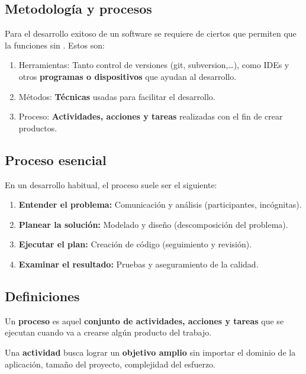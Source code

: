 \subsection{Metodología y procesos}\label{subsec:metodologia-y-procesos}
Para el desarrollo exitoso de un software se requiere de ciertos  que permiten que la  funciones sin .
Estos  son:
\begin{enumerate}
    \item Herramientas: Tanto control de versiones (git, subversion,\dots), como IDEs y otros \textbf{programas o dispositivos} que ayudan al desarrollo.
    \item Métodos: \textbf{Técnicas} usadas para facilitar el desarrollo.
    \item Proceso: \textbf{Actividades, acciones y tareas} realizadas con el fin de crear productos.
\end{enumerate}

\subsection{Proceso esencial}\label{subsec:proceso-esencial}
En un desarrollo habitual, el proceso suele ser el siguiente:

\begin{enumerate}
    \item \textbf{Entender el problema:} Comunicación y análisis (participantes, incógnitas).
    \item \textbf{Planear la solución:} Modelado y diseño (descomposición del problema).
    \item \textbf{Ejecutar el plan:} Creación de código (seguimiento y revisión).
    \item \textbf{Examinar el resultado:} Pruebas y aseguramiento de la calidad.
\end{enumerate}

\subsection{Definiciones}\label{subsec:definiciones}
\begin{definicion}
    Un \textbf{proceso} es aquel \textbf{conjunto de actividades, acciones y tareas} que se ejecutan cuando va a crearse algún producto del trabajo.
\end{definicion}
\begin{definicion}
    Una \textbf{actividad} busca lograr un \textbf{objetivo amplio} sin importar el dominio de la aplicación, tamaño del proyecto, complejidad del esfuerzo.
\end{definicion}


